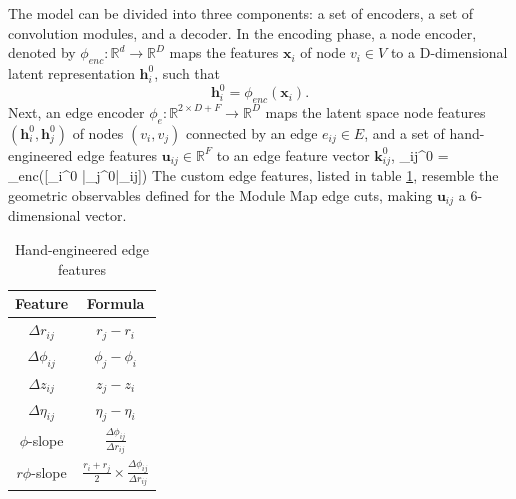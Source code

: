 The model can be divided into three components: a set of encoders, a set of convolution modules, and a decoder. In the encoding phase, a node encoder, denoted by $\phi_{enc}: \mathbb{R}^d \rightarrow \mathbb{R}^D$ maps the features $\mathbf{x}_i$ of node $v_i \in V$ to a D-dimensional latent representation $\mathbf{h}_i^0$, such that
\begin{equation}
    \label{eq:10.5}
    \mathbf{h}_i^0 = \phi_{enc}(\mathbf{x}_i).
\end{equation}
Next, an edge encoder $\phi_e:\mathbb{R}^{2\times D + F}\rightarrow \mathbb{R}^D$ maps the latent space node features $(\mathbf{h}_i^0, \mathbf{h}_j^0)$ of nodes $(v_i, v_j)$ connected by an edge $e_{ij}\in E$, and a set of hand-engineered edge features $\mathbf{u}_{ij}\in \mathbb{R}^F$ to an edge feature vector $\mathbf{k}_{ij}^0$,
\beq
\label{eq:10.6}
_{ij}^0 = \psi_{enc}([_i^0 |_j^0|_{ij}])
\eeq
The custom edge features, listed in table \ref{tab:gnn-edge-features}, resemble the geometric observables defined for the Module Map edge cuts, making $\mathbf{u}_{ij}$ a 6-dimensional vector.

\begin{table}[h!]
    \centering
    \begin{tabular}{|c|c|}
    \hline
      Feature & Formula \\ \hline\hline
     $\Delta r_{ij}$    & $r_j - r_i$ \\ \hline
     $\Delta \phi_{ij}$ & $\phi_j - \phi_i$ \\ \hline
     $\Delta z_{ij}$ & $z_j - z_i$ \\ \hline
     $\Delta \eta_{ij}$ & $\eta_j - \eta_i$ \\ \hline
     $\phi$-slope & $\frac{\Delta\phi_{ij}}{\Delta r_{ij}}$ \\ \hline
     $r\phi$-slope & $\frac{r_i+r_j}{2}\times \frac{\Delta\phi_{ij}}{\Delta r_{ij}}$ \\ \hline \hline
    \end{tabular}
    \caption{Hand-engineered edge features}
    \label{tab:gnn-edge-features}
\end{table}

